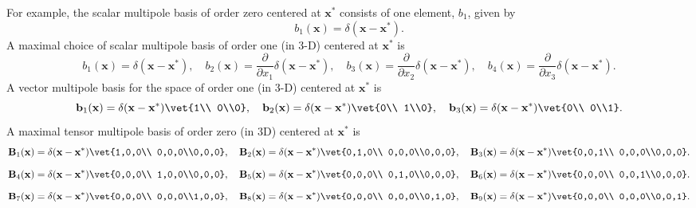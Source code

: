 For example, the scalar multipole basis of order zero centered 
at $\mathbf x^*$ consists of one element, $b_1$, given by
\[
        b_1(\mathbf x) = \delta(\mathbf x-\mathbf x^*).
\]
A maximal choice of scalar multipole basis of order one (in 3-D) centered at $\mathbf x^*$ is
\[
        b_1(\mathbf x) = \delta(\mathbf x - \mathbf x^*), \quad 
        b_2(\mathbf x) = \frac{\partial}{\partial x_1}\delta(\mathbf x-\mathbf x^*), \quad
        b_3(\mathbf x) = \frac{\partial}{\partial x_2}\delta(\mathbf x-\mathbf x^*), \quad
        b_4(\mathbf x) = \frac{\partial}{\partial x_3}\delta(\mathbf x-\mathbf x^*).
\]
A vector multipole basis for the space of order one (in 3-D) centered at $\mathbf x^*$ is
\[
        \mathbf b_1(\mathbf x) = \delta(\mathbf x-\mathbf x^*) \vet{1\\ 0\\0}, \quad 
        \mathbf b_2(\mathbf x) = \delta(\mathbf x-\mathbf x^*) \vet{0\\ 1\\0}, \quad 
        \mathbf b_3(\mathbf x) = \delta(\mathbf x-\mathbf x^*) \vet{0\\ 0\\1}.
\]
A maximal tensor multipole basis of order zero (in 3D)  centered at $\mathbf x^*$ is
\[
        \mathbf B_1(\mathbf x) = \delta(\mathbf x-\mathbf x^*) \vet{1,0,0\\ 0,0,0\\0,0,0}, \quad 
        \mathbf B_2(\mathbf x) = \delta(\mathbf x-\mathbf x^*) \vet{0,1,0\\ 0,0,0\\0,0,0}, \quad 
        \mathbf B_3(\mathbf x) = \delta(\mathbf x-\mathbf x^*) \vet{0,0,1\\ 0,0,0\\0,0,0}.
\]
\[
        \mathbf B_4(\mathbf x) = \delta(\mathbf x-\mathbf x^*) \vet{0,0,0\\ 1,0,0\\0,0,0}, \quad 
        \mathbf B_5(\mathbf x) = \delta(\mathbf x-\mathbf x^*) \vet{0,0,0\\ 0,1,0\\0,0,0}, \quad 
        \mathbf B_6(\mathbf x) = \delta(\mathbf x-\mathbf x^*) \vet{0,0,0\\ 0,0,1\\0,0,0}.
\]
\[
        \mathbf B_7(\mathbf x) = \delta(\mathbf x-\mathbf x^*) \vet{0,0,0\\ 0,0,0\\1,0,0}, \quad 
        \mathbf B_8(\mathbf x) = \delta(\mathbf x-\mathbf x^*) \vet{0,0,0\\ 0,0,0\\0,1,0}, \quad 
        \mathbf B_9(\mathbf x) = \delta(\mathbf x-\mathbf x^*) \vet{0,0,0\\ 0,0,0\\0,0,1}.
\]

